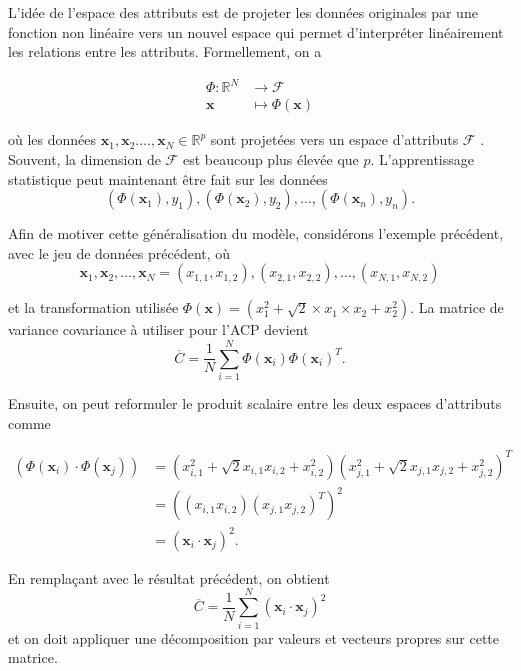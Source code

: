 L'idée de l'espace des attributs est de projeter les données originales par une fonction non linéaire vers un nouvel espace qui permet d'interpréter linéairement les relations entre les attributs. Formellement, on a 

\begin{align}\label{eq:featurespace}
\Phi : \mathbb{R}^N &\to \mathcal{F} \nonumber \\
\textbf{x} &\mapsto \Phi(\textbf{x}) 
\end{align}

où les données $\textbf{x}_1, \textbf{x}_2. \dots, \textbf{x}_N \in \mathbb{R}^p$ sont projetées vers un espace d'attributs $\mathcal{F}$ \cite{muller2001introduction}. Souvent, la dimension de $\mathcal{F}$ est beaucoup plus élevée que $p$. L'apprentissage statistique peut maintenant être fait sur les données $$(\Phi(\textbf{x}_1), y_1), (\Phi(\textbf{x}_2), y_2), \dots, (\Phi(\textbf{x}_n), y_n).$$

Afin de motiver cette généralisation du modèle, considérons l'exemple précédent, avec le jeu de données précédent, où
$$\textbf{x}_1, \textbf{x}_2, \dots, \textbf{x}_N = (x_{1,1},x_{1,2}), (x_{2,1}, x_{2,2}), …, (x_{N,1}, x_{N,2})$$

et la transformation utilisée $\Phi(\textbf{x})= (x_1^2 + \sqrt{2} \times x_1\times x_2 + x_2^2)$. La matrice de variance covariance à utiliser pour l’ACP devient
$$\overline{C} = \frac{1}{N} \sum_{i = 1}^{N}   \Phi(\textbf{x}_i) \Phi(\textbf{x}_i)^{T}.$$

Ensuite, on peut reformuler le produit scalaire entre les deux espaces d'attributs comme

\begin{align*}
(\Phi(\textbf{x}_i) \cdot \Phi(\textbf{x}_j)) &= (x_{i, 1}^2 + \sqrt{2} x_{i, 1} x_{i, 2} + x_{i, 2}^2)(x_{j, 1}^2 + \sqrt{2} x_{j, 1} x_{j, 2} + x_{j, 2}^2)^T\\
&= ((x_{i, 1}x_{i, 2})(x_{j, 1}x_{j, 2})^T)^2\\
&= (\textbf{x}_i \cdot \textbf{x}_j)^2.
\end{align*}

En remplaçant avec le résultat précédent, on obtient
$$\overline{C} = \frac{1}{N} \sum_{i = 1}^{N} (\textbf{x}_i \cdot \textbf{x}_j)^2$$ et on doit appliquer une décomposition par valeurs et vecteurs propres sur cette matrice.
